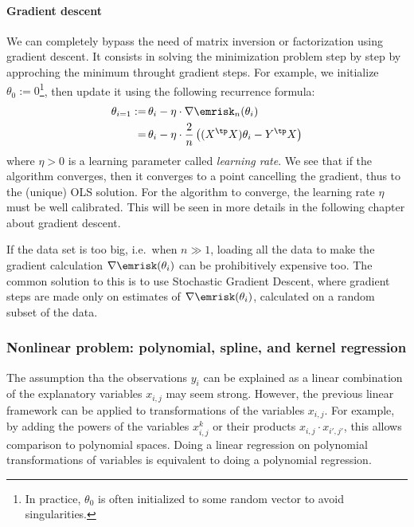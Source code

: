 \documentclass[toc]{../cs-classes/cs-classes}
\begin{document}
\paragraph*{Gradient descent}
We can completely bypass the need of matrix inversion or factorization using gradient descent. It consists in solving the minimization problem step by step by approching the minimum throught gradient steps. For example, we initialize $\theta_0:=0$\footnote{In practice, $\theta_0$ is often initialized to some random vector to avoid singularities.}, then update it using the following recurrence formula:
\begin{equation*}
    \begin{aligned}
        \theta_{i=1} :=&\, \theta_i -\eta\cdot\nabla\emrisk_n(\theta_i)\\
        =&\, \theta_i - \eta\cdot\frac{2}{n}\left((X^\tp X)\theta_i - Y^\tp X\right)
    \end{aligned}
\end{equation*}
where $\eta>0$ is a learning parameter called \emph{learning rate}. We see that if the algorithm converges, then it converges to a point cancelling the gradient, thus to the (unique) OLS solution. For the algorithm to converge, the learning rate $\eta$ must be well calibrated. This will be seen in more details in the following chapter about gradient descent.

If the data set is too big, i.e.~when $n\gg1$, loading all the data to make the gradient calculation $\nabla\emrisk(\theta_i)$ can be prohibitively expensive too. The common solution to this is to use Stochastic Gradient Descent, where gradient steps are made only on estimates of $\nabla\emrisk(\theta_i)$, calculated on a random subset of the data.

\subsubsection{Nonlinear problem: polynomial, spline, and kernel regression}
The assumption tha the observations $y_i$ can be explained as a linear combination of the explanatory variables $x_{i, j}$ may seem strong. However, the previous linear framework can be applied to transformations of the variables $x_{i, j}$. For example, by adding the powers of the variables $x^k_{i, j}$ or their products $x_{i, j}\cdot x_{i', j'}$, this allows comparison to polynomial spaces. Doing a linear regression on polynomial transformations of variables is equivalent to doing a polynomial regression.
\end{document}
